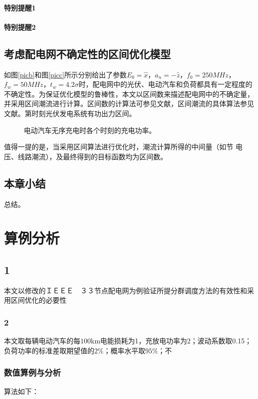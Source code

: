 \documentclass[bachelor]{NCEPU-thesis}
\begin{document}
\subsubsection{特别提醒1}

\subsubsection{特别提醒2}

\section{考虑配电网不确定性的区间优化模型}

如图\ref{picb}和图\ref{picc}所示分别给出了参数$E_0=\hat{x}$，$a_n=-\hat{z}$，$f_0=250MHz$，$f_w=50MHz$，$t_w=4.2\sigma$时，配电网中的光伏、电动汽车和负荷都具有一定程度的不确定性。为保证优化模型的鲁棒性，本文以区间数来描述配电网中的不确定量，并采用区间潮流进行计算。区间数的计算法可参见文献，区间潮流的具体算法参见文献。第时刻光伏发电系统有功出力区间。
\begin{figure}[h]
	\caption{电动汽车无序充电时各个时刻的充电功率。}
	\label{fig1}
\end{figure}
值得一提的是，当采用区间算法进行优化时，潮流计算所得的中间量（如节 电压、线路潮流），及最终得到的目标函数均为区间数。

\section{本章小结}
总结。

\chapter{算例分析}
\section{1}
本文以修改的ＩＥＥＥ　３３节点配电网为例验证所提分群调度方法的有效性和采用区间优化的必要性
\subsection{2}
本文取每辆电动汽车的每$100$km电能损耗为1，充放电功率为2；波动系数取0.15；负荷功率的标准差取期望值的$2\%$；概率水平取$95\%$；不

\subsection{数值算例与分析}
算法如下：
\end{document}
